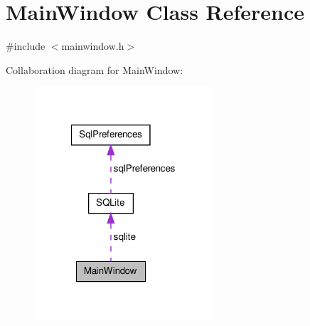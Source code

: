 \hypertarget{classMainWindow}{\section{\-Main\-Window \-Class \-Reference}
\label{classMainWindow}
}


{\ttfamily \#include $<$mainwindow.\-h$>$}



\-Collaboration diagram for \-Main\-Window\-:\nopagebreak
\begin{figure}[H]
\begin{center}
\leavevmode
\includegraphics[width=190pt]{classMainWindow__coll__graph}
\end{center}
\end{figure}
